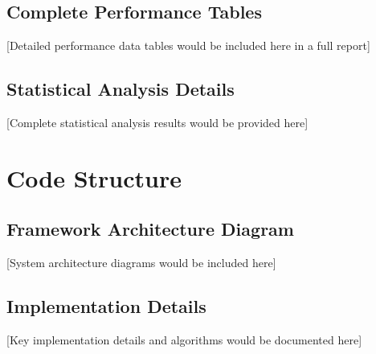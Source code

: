 \documentclass[11pt,a4paper]{article}
\begin{document}
\subsection{Complete Performance Tables}

[Detailed performance data tables would be included here in a full report]

\subsection{Statistical Analysis Details}

[Complete statistical analysis results would be provided here]

\section{Code Structure}

\subsection{Framework Architecture Diagram}

[System architecture diagrams would be included here]

\subsection{Implementation Details}

[Key implementation details and algorithms would be documented here]
\end{document}
